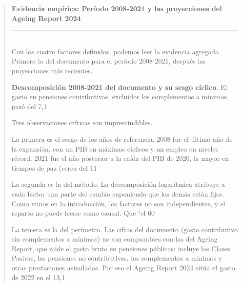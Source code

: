 \documentclass[10pt,a4paper]{article}
\newenvironment{specialblock}[1]{%
      \begin{quote} %
      \small %
      \noindent\textbf{#1}\\[-0.3em] %
      \rule{\linewidth}{0.4pt}\\[0.6em]}{
      \end{quote}}
\begin{document}
\begin{specialblock}{\textbf{Evidencia empírica:} Período 2008-2021 y las proyecciones del Ageing Report 2024}
    Con los cuatro factores definidos, podemos leer la evidencia agregada. Primero la del documento para el período 2008-2021, después las proyecciones más recientes.

    \textbf{Descomposición 2008-2021 del documento y su sesgo cíclico}. El gasto en pensiones contributivas, excluidos los complementos a mínimos, pasó del 7,1%
    
    Tres observaciones críticas son imprescindibles.
    
    La primera es el sesgo de los años de referencia. 2008 fue el último año de la expansión, con un PIB en máximos cíclicos y un empleo en niveles récord. 2021 fue el año posterior a la caída del PIB de 2020, la mayor en tiempos de paz (cerca del 11%
    
    La segunda es la del método. La descomposición logarítmica atribuye a cada factor una parte del cambio suponiendo que los demás están fijos. Como vimos en la introducción, los factores no son independientes, y el reparto no puede leerse como causal. Que "el 60%
    
    La tercera es la del perímetro. Las cifras del documento (gasto contributivo sin complementos a mínimos) no son comparables con las del Ageing Report, que mide el gasto bruto en pensiones públicas: incluye las Clases Pasivas, las pensiones no contributivas, los complementos a mínimos y otras prestaciones asimiladas. Por eso el Ageing Report 2024 sitúa el gasto de 2022 en el 13,1%
    

\end{specialblock}
\end{document}
